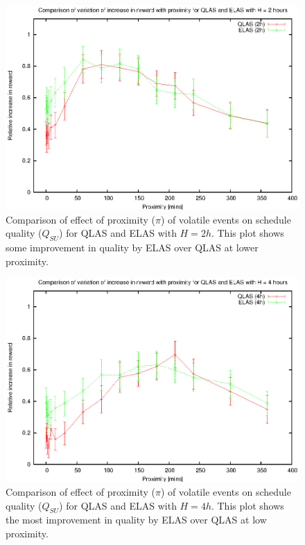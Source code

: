 \begin{figure}[htbp]
\begin{center}
    \includegraphics[scale=1.0, angle=0]{figures/evplot_2.eps}
\end{center}
\caption[Comparison of effect of proximity ($\pi$) of volatile events on schedule quality ($Q_{SU}$) for QLAS and ELAS ($H = 2h$).]
{Comparison of effect of proximity ($\pi$) of volatile events on schedule quality ($Q_{SU}$) for QLAS and ELAS with $H = 2h$. This plot shows some improvement in quality by ELAS over QLAS at lower proximity.}
\label{fig:vol_qe2_pi}
\end{figure}

\begin{figure}[htbp]
\begin{center}
    \includegraphics[scale=1.0, angle=0]{figures/evplot_4.eps}
\end{center}
\caption[Comparison of effect of proximity ($\pi$) of volatile events on schedule quality ($Q_{SU}$) for QLAS and ELAS ($H = 4h$).]
{Comparison of effect of proximity ($\pi$) of volatile events on schedule quality ($Q_{SU}$) for QLAS and ELAS with $H = 4h$. This plot shows the most improvement in quality by ELAS over QLAS at low proximity.}
\label{fig:vol_qe4_pi}
\end{figure}

